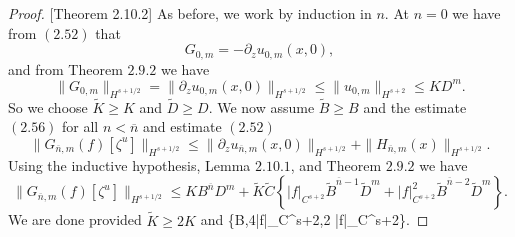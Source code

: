 \begin{proof}{[Theorem 2.10.2]} As before, we work by induction in $n$. At $n=0$ we have from $(2.52)$ that
$$G_{0,m}=-\partial_z u_{0,m}(x,0),$$
and from Theorem $2.9.2$ we have
$$\|G_{0,m}\|_{H^{s+1/2}} = \|\partial_z u_{0,m}(x,0)\|_{H^{s+1/2}}\le  \|u_{0,m}\|_{H^{s+2}} \le KD^m.$$
So we choose $\tilde{K} \ge K$ and $\tilde{D} \ge D$. We now assume $\tilde{B} \ge B$ and the estimate $(2.56)$ for all $n < \overline{n}$ and estimate $(2.52)$
$$\|G_{\overline{n},m}(f)[\zeta^u]\|_{H^{s+1/2}}\le \|\partial_z u_{\overline{n},m}(x,0)\|_{H^{s+1/2}}+ \|H_{\overline{n},m}(x)\|_{H^{s+1/2}}.$$
Using the inductive hypothesis, Lemma $2.10.1$, and Theorem $2.9.2$ we have
$$\|G_{\overline{n},m}(f)[\zeta^u]\|_{H^{s+1/2}}\le KB^{\overline{n}}D^m + \tilde{K}\tilde{C}\left\{|f|_{C^{s+2}}\tilde{B}^{\overline{n}-1}\tilde{D}^{m}+ |f|_{C^{s+2}}^2\tilde{B}^{\overline{n}-2}\tilde{D}^{m}\right\}.$$
We are done provided $\tilde{K} \ge 2K$ and
\bes
{} \ge \max\left\{B,4|f|_{C^{s+2}},2 |f|_{C^{s+2}}\right\}.\qedhere
\ees
\end{proof}